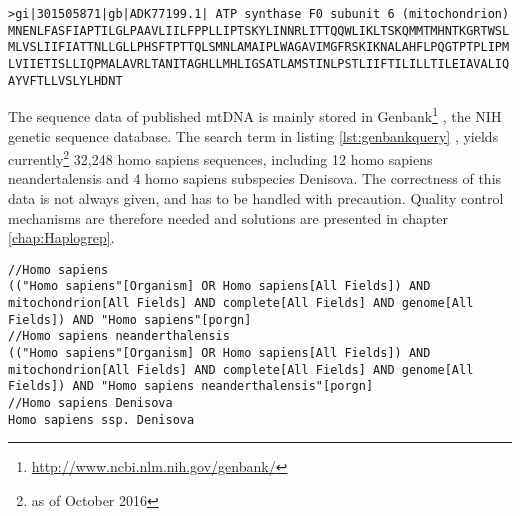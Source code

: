 {\small 
\begin{lstlisting}[caption= {Example of a FASTA protein sequence - here the complete ATP-6 gene}, label={lst:fastaAAC}]
>gi|301505871|gb|ADK77199.1| ATP synthase F0 subunit 6 (mitochondrion)
MNENLFASFIAPTILGLPAAVLIILFPPLLIPTSKYLINNRLITTQQWLIKLTSKQMMTMHNTKGRTWSL
MLVSLIIFIATTNLLGLLPHSFTPTTQLSMNLAMAIPLWAGAVIMGFRSKIKNALAHFLPQGTPTPLIPM
LVIIETISLLIQPMALAVRLTANITAGHLLMHLIGSATLAMSTINLPSTLIIFTILILLTILEIAVALIQ
AYVFTLLVSLYLHDNT
\end{lstlisting}
}
The sequence data of published mtDNA is mainly stored in Genbank\footnote{\url{http://www.ncbi.nlm.nih.gov/genbank/}} \cite{Benson2005}, the NIH genetic sequence database. The search term in listing \ref{lst:genbankquery} , yields currently\footnote{as of October 2016} 32,248 homo sapiens sequences, including 12 homo sapiens neandertalensis and 4 homo sapiens subspecies Denisova. 
The correctness of this data is not always given, and has to be handled with precaution. Quality control mechanisms are therefore needed and solutions are presented in chapter \ref{chap:Haplogrep}. 
\begin{lstlisting}[caption={GenBank queries for mtDNA sequences}, label={lst:genbankquery}]
//Homo sapiens
(("Homo sapiens"[Organism] OR Homo sapiens[All Fields]) AND mitochondrion[All Fields] AND complete[All Fields] AND genome[All Fields]) AND "Homo sapiens"[porgn]
//Homo sapiens neanderthalensis
(("Homo sapiens"[Organism] OR Homo sapiens[All Fields]) AND mitochondrion[All Fields] AND complete[All Fields] AND genome[All Fields]) AND "Homo sapiens neanderthalensis"[porgn] 
//Homo sapiens Denisova
Homo sapiens ssp. Denisova 
\end{lstlisting}
